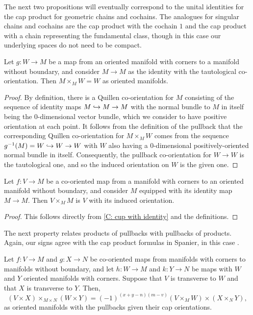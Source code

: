 The next two propositions will eventually correspond to the unital identities for the cap product for geometric chains and cochains.
The analogues for singular chains and cochains are the cap product with the cochain $1$ and the cap product with a chain representing the fundamental class, though in this case our underlying spaces do not need to be compact.

\begin{proposition}\label{P: cap with 1}
	Let $g \colon W \to M$ be a map from an oriented manifold with corners to a manifold without boundary, and consider $M \to M$ as the identity with the tautological co-orientation.
	Then $M \times_M W = W$ as oriented manifolds.
\end{proposition}

\begin{proof}
	By definition, there is a Quillen co-orientation for $M$ consisting of the sequence of identity maps $M \hookrightarrow M \to M$ with the normal bundle to $M$ in itself being the $0$-dimensional vector bundle, which we consider to have positive orientation at each point.
	It follows from the definition of the pullback that the corresponding Quillen co-orientation for $M \times_M W$ comes from the sequence $g^{-1}(M) = W \hookrightarrow W \to W$ with $W$ also having a $0$-dimensional positively-oriented normal bundle in itself.
	Consequently, the pullback co-orientation for $W \to W$ is the tautological one, and so the induced orientation on $W$ is the given one.
\end{proof}

\begin{proposition}\label{P: cap with identity M}
	Let $f \colon V \to M$ be a co-oriented map from a manifold with corners to an oriented manifold without boundary, and consider $M$ equipped with its identity map $M \to M$.
	Then $V \times_M M$ is $V$ with its induced orientation.
\end{proposition}

\begin{proof}
	This follows directly from \cref{C: cup with identity} and the definitions.
\end{proof}

The next property relates products of pullbacks with pullbacks of products. Again, our signs agree with the cap product formulas in Spanier, in this case \cite[Section 5.6.21]{Span81}.

\begin{proposition}\label{P: cap cross}
	Let $f \colon V \to M$ and $g:X \to N$ be co-oriented maps from manifolds with corners to manifolds without boundary, and let $h \colon W \to M$ and $k \colon Y \to N$ be maps with $W$ and $Y$ oriented manifolds with corners.
	Suppose that $V$ is transverse to $W$ and that $X$ is transverse to $Y$.
	Then,
	$$(V \times X)\times_{M \times N} (W \times Y) = (-1)^{(x+y-n)(m-v)} (V \times_M W) \times (X \times_N Y),$$
	as oriented manifolds with the pullbacks given their cap orientations.
\end{proposition}

